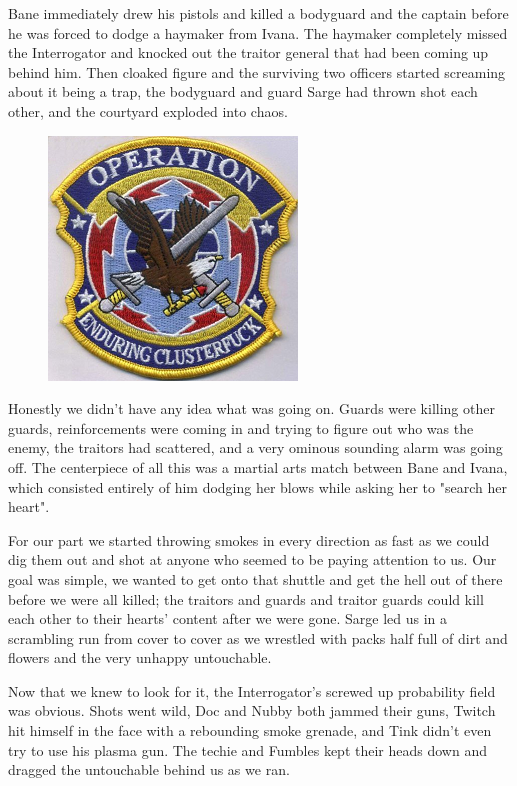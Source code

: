 Bane immediately drew his pistols and killed a bodyguard and the captain before he was forced to dodge a haymaker from Ivana. 
The haymaker completely missed the Interrogator and knocked out the traitor general that had been coming up behind him. 
Then cloaked figure and the surviving two officers started screaming about it being a trap, the bodyguard and guard Sarge had thrown shot each other, and the courtyard exploded into chaos.

\begin{figure}
	\begin{center}
		\includegraphics[width=\figwidth]{pics/9/48.png}
	\end{center}
\end{figure}
Honestly we didn't have any idea what was going on. 
Guards were killing other guards, reinforcements were coming in and trying to figure out who was the enemy, the traitors had scattered, and a very ominous sounding alarm was going off. 
The centerpiece of all this was a martial arts match between Bane and Ivana, which consisted entirely of him dodging her blows while asking her to "search her heart".

For our part we started throwing smokes in every direction as fast as we could dig them out and shot at anyone who seemed to be paying attention to us. 
Our goal was simple, we wanted to get onto that shuttle and get the hell out of there before we were all killed; 
the traitors and guards and traitor guards could kill each other to their hearts' content after we were gone. 
Sarge led us in a scrambling run from cover to cover as we wrestled with packs half full of dirt and flowers and the very unhappy untouchable.

Now that we knew to look for it, the Interrogator's screwed up probability field was obvious. 
Shots went wild, Doc and Nubby both jammed their guns, Twitch hit himself in the face with a rebounding smoke grenade, and Tink didn't even try to use his plasma gun. 
The techie and Fumbles kept their heads down and dragged the untouchable behind us as we ran.

